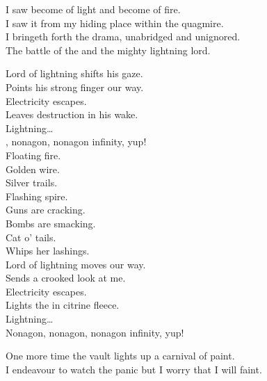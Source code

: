I saw  become of light and  become of fire. \\
I saw it from my hiding place within the quagmire. \\

I bringeth forth the drama, unabridged and unignored. \\
The battle of the  and the mighty lightning lord. \\





Lord of lightning shifts his gaze. \\
Points his strong finger our way. \\
Electricity escapes. \\
Leaves destruction in his wake. \\

Lightning… \\

, nonagon, nonagon infinity, yup! \\

Floating fire. \\
Golden wire. \\
Silver trails. \\
Flashing spire. \\

Guns are cracking. \\
Bombs are smacking. \\
Cat o' tails. \\
Whips her lashings. \\

Lord of lightning moves our way. \\
Sends a crooked look at me. \\
Electricity escapes. \\
Lights the  in citrine fleece. \\

Lightning… \\

Nonagon, nonagon, nonagon infinity, yup! \\


One more time the vault lights up a carnival of paint. \\
I endeavour to watch the panic but I worry that I will faint. \\

